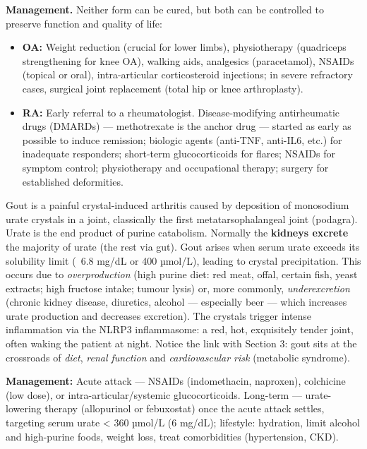 \documentclass[11pt]{article}
\newcommand{\cle}[1]{{\popxbold\color{popdark}#1}}
\newcounter{popsec}
\newcounter{popsub}
\newcommand{\courssub}[1]{%
  \stepcounter{popsub}%
  \par\vspace{9pt}\noindent{\popxbold\fontsize{11.5}{13}\selectfont\color{popink}{\color{poporange}\thepopsec.\thepopsub}\hspace{6pt}#1}\par\nopagebreak\vspace{4pt}
}
\begin{document}
\textbf{Management.} Neither form can be cured, but both can be controlled to preserve function and quality of life:
\begin{itemize}
\item \textbf{OA:} Weight reduction (crucial for lower limbs), physiotherapy (quadriceps strengthening for knee OA), walking aids, analgesics (paracetamol), NSAIDs (topical or oral), intra-articular corticosteroid injections; in severe refractory cases, surgical joint replacement (total hip or knee arthroplasty).
\item \textbf{RA:} Early referral to a rheumatologist. Disease-modifying antirheumatic drugs (DMARDs) — methotrexate is the anchor drug — started as early as possible to induce remission; biologic agents (anti-TNF, anti-IL6, etc.) for inadequate responders; short-term glucocorticoids for flares; NSAIDs for symptom control; physiotherapy and occupational therapy; surgery for established deformities.
\end{itemize}

\courssub{Gout: crystals in the joint}

\cle{Gout} is a painful crystal-induced arthritis caused by deposition of monosodium \cle{urate} crystals in a joint, classically the first metatarsophalangeal joint (podagra). Urate is the end product of purine catabolism. Normally the \textbf{kidneys excrete} the majority of urate (the rest via gut). Gout arises when serum urate exceeds its solubility limit (~6.8 mg/dL or 400 µmol/L), leading to crystal precipitation. This occurs due to \emph{overproduction} (high purine diet: red meat, offal, certain fish, yeast extracts; high fructose intake; tumour lysis) or, more commonly, \emph{underexcretion} (chronic kidney disease, diuretics, alcohol — especially beer — which increases urate production and decreases excretion). The crystals trigger intense inflammation via the NLRP3 inflammasome: a red, hot, exquisitely tender joint, often waking the patient at night. Notice the link with Section 3: gout sits at the crossroads of \emph{diet}, \emph{renal function} and \emph{cardiovascular risk} (metabolic syndrome).

\textbf{Management:} Acute attack — NSAIDs (indomethacin, naproxen), colchicine (low dose), or intra-articular/systemic glucocorticoids. Long-term — urate-lowering therapy (allopurinol or febuxostat) once the acute attack settles, targeting serum urate < 360 µmol/L (6 mg/dL); lifestyle: hydration, limit alcohol and high-purine foods, weight loss, treat comorbidities (hypertension, CKD).
\end{document}
